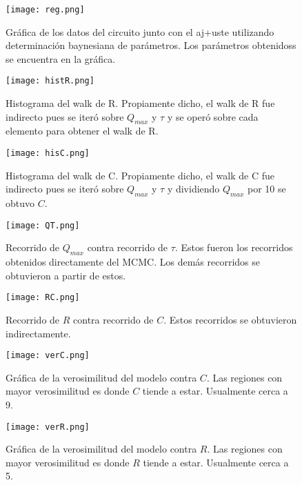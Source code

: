 ﻿\documentclass[notitlepage,letterpaper,12pt]{article}%
\begin{document}
\begin{figure}[h!]
  \centering
   \texttt{[image: reg.png]}
  \caption{Gráfica de los datos del circuito junto con el aj+uste utilizando determinación baynesiana de parámetros. Los parámetros obtenidoss se encuentra en la gráfica. }
  \label{reg}
\end{figure}

\begin{figure}[h!]
  \centering
   \texttt{[image: histR.png]}
  \caption{Histograma del walk de R. Propiamente dicho, el walk de R fue indirecto pues se iteró sobre $Q_{max}$ y $\tau$ y se operó sobre cada elemento para obtener el walk de  R.}
  \label{histR}
\end{figure}

\begin{figure}[h!]
  \centering
   \texttt{[image: hisC.png]}
  \caption{Histograma del walk de C. Propiamente dicho, el walk de C fue indirecto pues se iteró sobre $Q_{max}$ y $\tau$ y dividiendo $Q_{max}$ por 10 se obtuvo $C$. }
  \label{hisC}
\end{figure}

\begin{figure}[h!]
  \centering
   \texttt{[image: QT.png]}
  \caption{Recorrido de $Q_{max}$ contra recorrido de $\tau$. Estos fueron los recorridos obtenidos directamente del MCMC. Los demás recorridos se obtuvieron a partir de estos.}
  \label{QT}
\end{figure}

\begin{figure}[h!]
  \centering
   \texttt{[image: RC.png]}
  \caption{Recorrido de $R$ contra recorrido de $C$. Estos recorridos se obtuvieron indirectamente.}
  \label{RC}
\end{figure}

\begin{figure}[h!]
  \centering
   \texttt{[image: verC.png]}
  \caption{Gráfica de la verosimilitud del modelo contra $C$. Las regiones con mayor verosimilitud es donde $C$ tiende a estar. Usualmente cerca a 9.}
  \label{verC}
\end{figure}

\begin{figure}[h!]
  \centering
   \texttt{[image: verR.png]}
  \caption{Gráfica de la verosimilitud del modelo contra $R$. Las regiones con mayor verosimilitud es donde $R$ tiende a estar. Usualmente cerca a 5.}
  \label{verR}
\end{figure}
\end{document}
